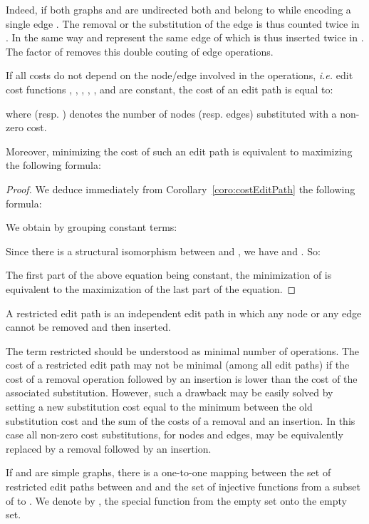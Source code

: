   Indeed, if both graphs  and  are undirected both 
  and  belong to  while encoding a single edge .  The
  removal or the substitution of the edge  is thus counted twice in
  . In the same way  and  represent the
  same edge  of  which is thus inserted twice in
  . The factor  of  removes
   this double couting of edge operations.
\begin{corollary}\label{coro:costEditPathConst}
  If all costs do not depend on the node/edge involved in the operations, \textit{i.e.} edit cost functions , , , , , and  are constant, the cost of an edit path  is equal to:
  \renewcommand{\arraystretch}{1.5}
  
  where  (resp. ) denotes the number of
  nodes (resp. edges) substituted with a non-zero cost.
  
  Moreover, minimizing the cost of such an edit path is
  equivalent to maximizing the following formula:
  
\end{corollary}
\begin{proof}
  We deduce immediately from Corollary~\ref{coro:costEditPath} the
  following formula:
  \renewcommand{\arraystretch}{1.5}
  
  We obtain by grouping constant terms:
  \renewcommand{\arraystretch}{1.5}
  
  Since there is a structural isomorphism between  and
  , we have  and
  . So:
  
  The first part of the above equation being constant, the
  minimization of  is equivalent to the maximization of
  the last part of the equation.
\end{proof}
\begin{definition}
  A restricted edit path is an independent edit path in which any node or
  any edge cannot be removed and then inserted.
\end{definition}
The term restricted should be understood as minimal number
of operations. The cost of a restricted edit path may not be minimal
(among all edit paths) if the cost of a removal operation followed by
an insertion is lower than the cost of the associated
substitution. However, such a drawback may be easily solved by setting
a new substitution cost equal to the minimum between the old substitution
cost and the sum of the costs of a removal and an insertion. In this
case all non-zero cost substitutions, for nodes and edges, may be equivalently
replaced by a removal followed by an insertion.
\begin{proposition}\label{prop:edit_path_mapping}
  If  and  are simple graphs, there is a one-to-one mapping
  between the set of restricted edit paths between  and  and
  the set of injective functions from a subset of  to . We
  denote by , the special function from the empty set onto
  the empty set.
\end{proposition}
